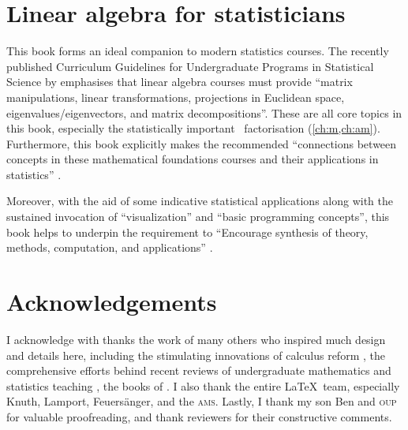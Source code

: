 \section*{Linear algebra for statisticians}

This book forms an ideal companion to modern statistics courses.
The recently published Curriculum Guidelines for Undergraduate Programs in Statistical Science by \cite{StatsEduGuidelines2014} emphasises that linear algebra courses must provide ``matrix manipulations, linear transformations, projections in Euclidean space, eigenvalues\slash eigenvectors, and matrix decompositions''.
These are all core topics in this book, especially the statistically 
important \svd\ factorisation (\cref{ch:m,ch:am}).
Furthermore, this book explicitly makes the recommended ``connections between concepts in these mathematical foundations courses and their applications in statistics'' \cite[p.12]{StatsEduGuidelines2014}.

Moreover, with the aid of some indicative statistical applications along with the sustained invocation of ``visualization'' and  ``basic programming concepts'', this book helps to underpin the requirement to ``Encourage synthesis of theory, methods, computation, and applications'' \cite[p.13]{StatsEduGuidelines2014}.






\section*{Acknowledgements}

I acknowledge with thanks the work of many others who inspired much design and details here, including 
the stimulating innovations of calculus reform \cite[e.g.]{HughesHallett2013},  
the comprehensive efforts behind recent reviews of  undergraduate mathematics and statistics teaching \cite[e.g.]{Alpers2013, Bressoud2014, Turner2014, StatsEduGuidelines2014, CUPMguide2015, gaimme2016}, 
the books of \cite{Anton6, Davis99a, Holt2013, Larson2013, Lay2012, Nakos1998, Poole2015, Will04}.
I also thank the entire \LaTeX\ team, especially Knuth, Lamport, Feuers\"anger, and the \textsc{ams}.
Lastly, I thank my son Ben and \textsc{oup} for valuable proofreading, and thank reviewers for their constructive comments. 







